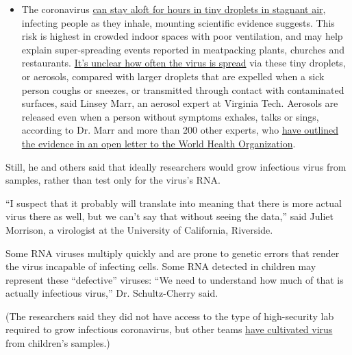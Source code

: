\begin{itemize}
  \begin{itemize}
  \tightlist
  \item
    The coronavirus
    \href{https://www.nytimes.com/2020/07/04/health/239-experts-with-one-big-claim-the-coronavirus-is-airborne.html?action=click\&pgtype=Article\&state=default\&region=MAIN_CONTENT_3\&context=storylines_faq}{can
    stay aloft for hours in tiny droplets in stagnant air}, infecting
    people as they inhale, mounting scientific evidence suggests. This
    risk is highest in crowded indoor spaces with poor ventilation, and
    may help explain super-spreading events reported in meatpacking
    plants, churches and restaurants.
    \href{https://www.nytimes.com/2020/07/06/health/coronavirus-airborne-aerosols.html?action=click\&pgtype=Article\&state=default\&region=MAIN_CONTENT_3\&context=storylines_faq}{It's
    unclear how often the virus is spread} via these tiny droplets, or
    aerosols, compared with larger droplets that are expelled when a
    sick person coughs or sneezes, or transmitted through contact with
    contaminated surfaces, said Linsey Marr, an aerosol expert at
    Virginia Tech. Aerosols are released even when a person without
    symptoms exhales, talks or sings, according to Dr. Marr and more
    than 200 other experts, who
    \href{https://academic.oup.com/cid/article/doi/10.1093/cid/ciaa939/5867798}{have
    outlined the evidence in an open letter to the World Health
    Organization}.
  \end{itemize}
\end{itemize}

Still, he and others said that ideally researchers would grow infectious
virus from samples, rather than test only for the virus's RNA.

``I suspect that it probably will translate into meaning that there is
more actual virus there as well, but we can't say that without seeing
the data,'' said Juliet Morrison, a virologist at the University of
California, Riverside.

Some RNA viruses multiply quickly and are prone to genetic errors that
render the virus incapable of infecting cells. Some RNA detected in
children may represent these ``defective'' viruses: ``We need to
understand how much of that is actually infectious virus,'' Dr.
Schultz-Cherry said.

(The researchers said they did not have access to the type of
high-security lab required to grow infectious coronavirus, but other
teams \href{https://pubmed.ncbi.nlm.nih.gov/32603290/}{have cultivated
virus} from children's samples.)

